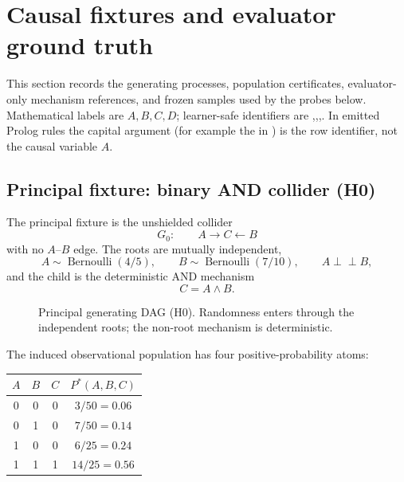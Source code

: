 \documentclass[11pt]{article}
\DeclareRobustCommand{\code}[1]{\texttt{\detokenize{#1}}}
\newcommand{\indep}{\perp\!\!\!\perp}
\begin{document}
\section{Causal fixtures and evaluator ground truth}

This section records the generating processes, population certificates,
evaluator-only mechanism references, and frozen samples used by the probes
below. Mathematical labels are \(A,B,C,D\); learner-safe identifiers are
\code{a},\code{b},\code{c},\code{d}. In emitted Prolog rules the capital
argument (for example the \code{A} in \code{c(A)}) is the row identifier, not
the causal variable \(A\).

\subsection{Principal fixture: binary AND collider (H0)}

The principal fixture is the unshielded collider
\[
G_0:\qquad A\longrightarrow C\longleftarrow B
\]
with no \(A\)--\(B\) edge. The roots are mutually independent,
\[
A\sim\operatorname{Bernoulli}(4/5),
\qquad
B\sim\operatorname{Bernoulli}(7/10),
\qquad
A\indep B,
\]
and the child is the deterministic AND mechanism
\[
C=A\land B.
\]

\begin{figure}[ht]
\centering
{}
\caption{Principal generating DAG (H0). Randomness enters through the
independent roots; the non-root mechanism is deterministic.}
\label{fig:h0-dag}
\end{figure}

The induced observational population has four positive-probability atoms:

\begin{center}
\begin{tabular}{@{}cccc@{}}
\toprule
\(A\) & \(B\) & \(C\) & \(P^\ast(A,B,C)\) \\
\midrule
0 & 0 & 0 & \(3/50=0.06\) \\
0 & 1 & 0 & \(7/50=0.14\) \\
1 & 0 & 0 & \(6/25=0.24\) \\
1 & 1 & 1 & \(14/25=0.56\) \\
\bottomrule
\end{tabular}
\end{center}
\end{document}
